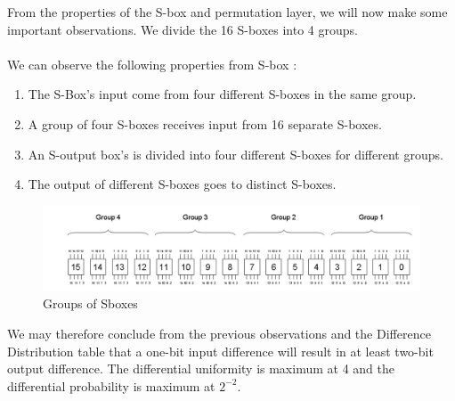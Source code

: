 \documentclass[journal=tosc,preprint]{iacrtrans}
\begin{document}
From the properties of the S-box and permutation layer, we will now make some important observations. We divide the 16 S-boxes into 4 groups.\\\\
We can observe the following properties from S-box : 
\begin{enumerate}
	\item The S-Box's input come from four different S-boxes in the same group.  
	\item A group of four S-boxes receives input from 16 separate S-boxes. 
	\item An S-output box's is divided into four different S-boxes for different groups. 
	\item The output of different S-boxes goes to distinct S-boxes. 
\end{enumerate}
\begin{figure}[h!]
	\centering
	\includegraphics[width=1.0\linewidth, height=0.19\textheight]{groups}
	\caption{Groups of Sboxes}
	\label{fig:groups}
\end{figure}
We may therefore conclude from the previous observations and the Difference Distribution table that a one-bit input difference will result in at least two-bit output difference.
The differential uniformity is maximum at 4 and the differential probability is maximum at $2^{-2}$. 
\end{document}
